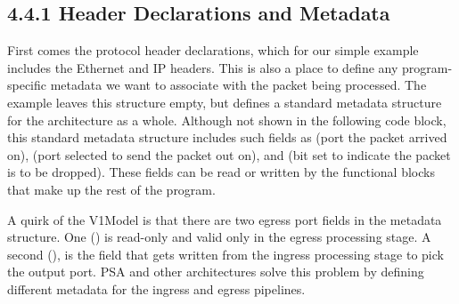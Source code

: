 \documentclass[letterpaper,11pt,english]{sphinxmanual}
\begin{document}
\subsection{4.4.1 Header Declarations and Metadata}
\label{\detokenize{switch:header-declarations-and-metadata}}
First comes the protocol header declarations, which for our simple
example includes the Ethernet and IP headers. This is also a place to
define any program-specific metadata we want to associate with the
packet being processed. The example leaves this structure empty, but
 defines a standard metadata structure for the
architecture as a whole. Although not shown in the following code
block, this standard metadata structure includes such fields as
 (port the packet arrived on),  (port
selected to send the packet out on), and  (bit set to indicate
the packet is to be dropped). These fields can be read or written by
the functional blocks that make up the rest of the program. %
\begin{footnote}[3]\sphinxAtStartFootnote
A quirk of the V1Model is that there are two egress port fields
in the metadata structure. One () is read-only and
valid only in the egress processing stage. A second
(), is the field that gets written from the ingress
processing stage to pick the output port. PSA and other
architectures solve this problem by defining different metadata for
the ingress and egress pipelines.
%
\end{footnote}
\end{document}
